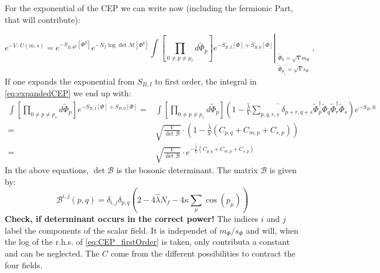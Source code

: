 For the exponential of the CEP we can write now (including the fermionic Part, that will contribute):

\begin{equation} \label{eq:expandedCEP}
 e^{-V\cdot U(m,s)} = e^{-S_{B,\Phi^g}[\Phi^g]} e^{-N_f \log \det \mathcal{M}[\Phi^g]} 
                      \int \left. \left[\prod\limits_{0 \neq p \neq p_s}  d \tilde \Phi_p \right]   
                      e^{-S_{B,I}[\Phi] +  S_{B,0}[\Phi]}
                       \right|_{ \begin{array}{l} \scriptscriptstyle \tilde \Phi_0=\sqrt{V} m_{\Phi} \\ 
                                     \scriptscriptstyle \tilde \Phi_{p_s}=\sqrt{V}s_{\Phi} \end{array}},
\end{equation}
If one expands the exponential from $S_{B,I}$ to first order, the integral in \eqref{eq:expandedCEP} we end up with:
\begin{align}\label{eq:CEP_firstOrder}
 \int \left[ \prod\limits_{0 \neq p \neq p_s}  d \tilde \Phi_p \right]   
                      e^{-S_{B,I}[\Phi] +  S_{B,0}[\Phi]} =& \int \left[ \prod\limits_{0 \neq p \neq p_s}  d \tilde \Phi_p \right] 
                      \left( 1 - \frac{\hat\lambda}{V} \widehat{\sum\limits_{p,q,r,s}}\delta_{p+r,q+s} 
                      \tilde\Phi_p^{\dagger} \tilde\Phi_q \tilde\Phi_r^{\dagger} \tilde\Phi_s \right)e^{-S_B,0} \nonumber \\
                      =& \sqrt{\frac{V}{\det \mathcal{B}}} \cdot \left(1 - \frac{\hat\lambda}{V} \left( C_{p,q} + C_{m,p} + C_{s,p} \right) \right) \nonumber \\
                      =& \sqrt{\frac{V}{\det \mathcal{B}}} \cdot e^{-\frac{\hat\lambda}{V} \left( C_{p,q} + C_{m,p} + C_{s,p} \right)}
\end{align}
In the above equations, $\det\mathcal{B}$ is the bosonic determinant. The matrix $\mathcal{B}$ is given by:
\begin{equation}\label{eq:def_BosonicDeterminant}
\mathcal{B}^{i,j}(p,q)=\delta_{i,j}\delta_{p,q} \left( 2 - 4 \hat\lambda N_f - 4 \kappa \sum\limits_{\mu} \cos(p_{\mu}) \right)
\end{equation}
\textbf{Check, if determinant occurs in the correct power!}
The indices $i$ and $j$ label the components of the scalar field. It is independet of $m_{\Phi}/s_{\Phi}$ and will, 
when the log of the r.h.s. of \eqref{eq:CEP_firstOrder} is taken, only contributa a constant and can be neglected.
The $C$ come from the different possibilities to contract the four fields. 
